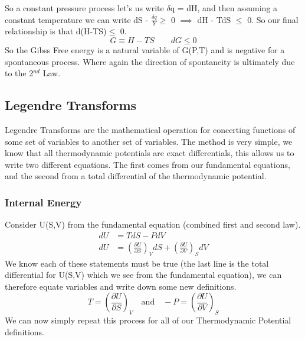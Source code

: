 \documentclass{article}
\begin{document}
So a constant pressure process let's us write $\delta$q = dH, and then assuming a constant temperature we can write dS - $\frac{\delta q}{Y} \geq$ 0 $\implies$ dH - TdS $\leq$ 0. 
So our final relationship is that d(H-TS)$\leq$ 0. 
\begin{equation}
    G \equiv H - TS \qquad dG \leq 0
\end{equation}
So the Gibss Free energy is a natural variable of G(P,T) and is negative for a spontaneous process. 
Where again the direction of spontaneity is ultimately due to the 2$^{nd}$ Law. 

\subsection*{Legendre Transforms}
Legendre Transforms are the mathematical operation for concerting functions of some set of variables to another set of variables. 
The method is very simple, we know that all thermodynamic potentials are exact differentials, this allows us to write two different equations.
The first comes from our fundamental equations, and the second from a total differential of the thermodynamic potential. 
\subsubsection*{Internal Energy}
Consider U(S,V) from the fundamental equation (combined first and second law). 
\begin{equation}
    \begin{split}
        dU &= TdS - PdV \\
        dU &= \left(\frac{\partial U}{\partial S}\right)_VdS + \left(\frac{\partial U}{\partial V}\right)_SdV 
    \end{split}
\end{equation}
We know each of these statements must be true (the last line is the total differential for U(S,V) which we see from the fundamental equation), we can therefore equate variables and write down some new definitions. 
\begin{equation}
    T = \left(\frac{\partial U}{\partial S}\right)_V \quad \text{and} \quad -P = \left(\frac{\partial U}{\partial V}\right)_S
\end{equation}
We can now simply repeat this process for all of our Thermodynamic Potential definitions. 
\end{document}
